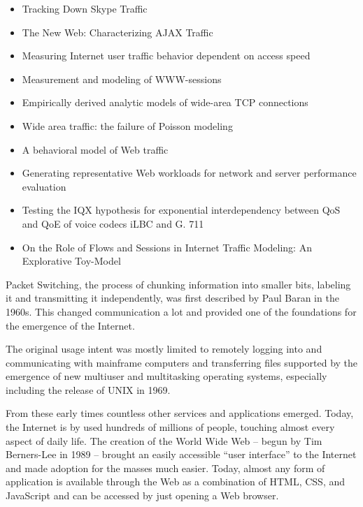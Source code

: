 \begin{itemize}
\item Tracking Down Skype Traffic \cite{4509656}
\item The New Web: Characterizing AJAX Traffic \cite{characterizeajax2008}
\item Measuring Internet user traffic behavior dependent on access speed \cite{vicari1999measuring}
\item Measurement and modeling of WWW-sessions \cite{vicari1997measurement}
\item Empirically derived analytic models of wide-area TCP connections \cite{Paxson:1994:EDA:189520.189525}
\item Wide area traffic: the failure of Poisson modeling \cite{Paxson:1995:WAT:208389.208390}
\item A behavioral model of Web traffic \cite{801961}
\item Generating representative Web workloads for network and server performance evaluation \cite{Barford:1998:GRW:277851.277897}
\item Testing the IQX hypothesis for exponential interdependency between QoS and QoE of voice codecs iLBC and G. 711 \cite{hossfeld2008testing}
\item On the Role of Flows and Sessions in Internet Traffic Modeling: An Explorative Toy-Model \cite{5425847}

\end{itemize}

Packet Switching, the process of chunking information into smaller bits, labeling it and transmitting it independently, was first described by Paul Baran in the 1960s\cite{baran1964distributed}. This changed communication a lot and provided one of the foundations for the emergence of the Internet. 

The original usage intent was mostly limited to remotely logging into and communicating with mainframe computers and transferring files supported by the emergence of new multiuser and multitasking operating systems, especially including the release of UNIX in 1969.

From these early times countless other services and applications emerged. Today, the Internet is by used hundreds of millions of people, touching almost every aspect of daily life. The creation of the World Wide Web -- begun by Tim Berners-Lee in 1989 -- brought an easily accessible ``user interface'' to the Internet and made adoption for the masses much easier. Today, almost any form of application is available through the Web as a combination of \gls{HTML}, \gls{CSS}, and JavaScript and can be accessed by just opening a Web browser.

